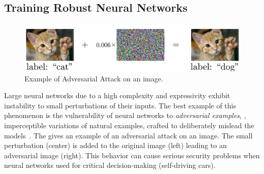 \subsection{Training Robust Neural Networks}
\label{subsection:ch1-training_robust_neural_networks}

\begin{figure}[t]
  \centering
  \includegraphics[width=\textwidth]{figures/main/ch1-introduction/ExampleAdversarialCatDog.pdf}
  \caption{Example of Adversarial Attack on an image.}
  \label{figure:ch1-adversarial_image_example}
\end{figure}

Large neural networks due to a high complexity and expressivity exhibit instability to small perturbations of their inputs.
The best example of this phenomenon is the vulnerability of neural networks to \emph{adversarial examples}, \ie, imperceptible variations of natural examples, crafted to deliberately mislead the models~\cite{globerson2006nightmare,biggio2013evasion,szegedy2013intriguing}.
The  gives an example of an adversarial attack on an image.
The small perturbation (center) is added to the original image (left) leading to an adversarial image (right).
This behavior can cause serious security problems when neural networks used for critical decision-making (\eg self-driving cars).


